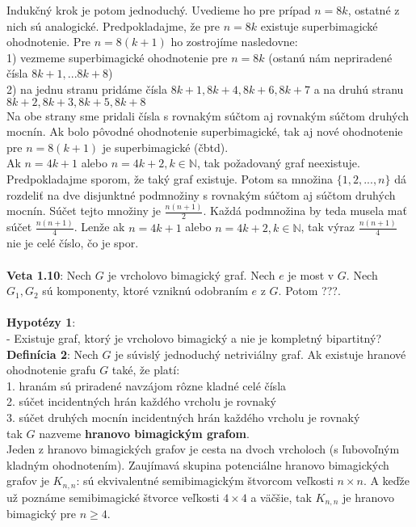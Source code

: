 \documentclass[12pt]{article}
\begin{document}
Indukčný krok je potom jednoduchý. Uvedieme ho pre prípad $n = 8k$, ostatné z nich sú analogické. Predpokladajme, že pre $n = 8k$ existuje superbimagické ohodnotenie. Pre $n = 8(k+1)$ ho zostrojíme nasledovne: \\
1) vezmeme superbimagické ohodnotenie pre $n = 8k$ (ostanú nám nepriradené čísla $8k+1, ... 8k+8$) \\
2) na jednu stranu pridáme čísla $8k+1, 8k+4, 8k+6, 8k+7$ a na druhú stranu $8k+2, 8k+3, 8k+5, 8k+8$ \\
Na obe strany sme pridali čísla s rovnakým súčtom aj rovnakým súčtom druhých mocnín. Ak bolo pôvodné ohodnotenie superbimagické, tak aj nové ohodnotenie pre $n = 8(k+1)$ je superbimagické (čbtd). \\

Ak $n = 4k+1$ alebo $n = 4k+2, k \in \mathbb{N}$, tak požadovaný graf neexistuje. Predpokladajme sporom, že taký graf existuje. Potom sa množina $\{1, 2, ... , n\}$ dá rozdeliť na dve disjunktné podmnožiny s rovnakým súčtom aj súčtom druhých mocnín. Súčet tejto množiny je $\frac{n(n+1)}{2}$. Každá podmnožina by teda musela mať súčet $\frac{n(n+1)}{4}$. Lenže ak  $n = 4k+1$ alebo $n = 4k+2, k \in \mathbb{N}$, tak výraz $\frac{n(n+1)}{4}$ nie je celé číslo, čo je spor. \\\\

\textbf{Veta 1.10}: Nech $G$ je vrcholovo bimagický graf. Nech $e$ je most v $G$. Nech $G_1, G_2$ sú komponenty, ktoré vzniknú odobraním $e$ z $G$. Potom ???. \\\\

\textbf{Hypotézy 1}: \\
- Existuje graf, ktorý je vrcholovo bimagický a nie je kompletný bipartitný? \\

\textbf{Definícia 2}: Nech $G$ je súvislý jednoduchý netriviálny graf. Ak existuje hranové ohodnotenie grafu $G$ také, že platí: \\
1. hranám sú priradené navzájom rôzne kladné celé čísla \\
2. súčet incidentných hrán každého vrcholu je rovnaký \\
3. súčet druhých mocnín incidentných hrán každého vrcholu je rovnaký \\
tak $G$ nazveme \textbf{hranovo bimagickým grafom}. \\

Jeden z hranovo bimagických grafov je cesta na dvoch vrcholoch (s ľubovoľným kladným ohodnotením). Zaujímavá skupina potenciálne hranovo bimagických grafov je $K _{n,n}$: sú ekvivalentné semibimagickým štvorcom veľkosti $n \times n$. A keďže už poznáme semibimagické štvorce veľkosti $4 \times 4$ a väčšie, tak $K _{n,n}$ je hranovo bimagický pre $n \geq 4$.  \\
\end{document}
